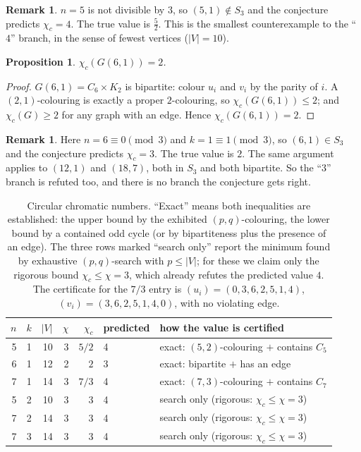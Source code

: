 \documentclass[11pt]{article}
\newtheorem{proposition}[theorem]{Proposition}
\theoremstyle{definition}
\newtheorem{remark}[theorem]{Remark}
\newcommand{\chic}{\chi_c}
\begin{document}
\begin{remark}
$n = 5$ is not divisible by $3$, so $(5,1) \notin S_3$ and the conjecture
predicts $\chic = 4$. The true value is $\tfrac52$. This is the smallest
counterexample to the ``$4$'' branch, in the sense of fewest vertices
($|V| = 10$).
\end{remark}

\begin{proposition}\label{prop:hex}
$\chic(G(6,1)) = 2$.
\end{proposition}

\begin{proof}
$G(6,1) = C_6 \times K_2$ is bipartite: colour $u_i$ and $v_i$ by the parity
of $i$. A $(2,1)$-colouring is exactly a proper $2$-colouring, so
$\chic(G(6,1)) \le 2$; and $\chic(G) \ge 2$ for any graph with an edge. Hence
$\chic(G(6,1)) = 2$.
\end{proof}

\begin{remark}
Here $n = 6 \equiv 0 \pmod 3$ and $k = 1 \equiv 1 \pmod 3$, so $(6,1) \in
S_3$ and the conjecture predicts $\chic = 3$. The true value is $2$. The same
argument applies to $(12,1)$ and $(18,7)$, both in $S_3$ and both bipartite.
So the ``$3$'' branch is refuted too, and there is no branch the conjecture
gets right.
\end{remark}

\begin{table}[h]
\centering
\begin{tabular}{rrrrrll}
\toprule
$n$ & $k$ & $|V|$ & $\chi$ & $\chic$ & predicted & how the value is certified\\
\midrule
5 & 1 & 10 & 3 & $5/2$ & 4 & exact: $(5,2)$-colouring $+$ contains $C_5$\\
6 & 1 & 12 & 2 & $2$   & 3 & exact: bipartite $+$ has an edge\\
7 & 1 & 14 & 3 & $7/3$ & 4 & exact: $(7,3)$-colouring $+$ contains $C_7$\\
5 & 2 & 10 & 3 & $3$   & 4 & search only (rigorous: $\chic \le \chi = 3$)\\
7 & 2 & 14 & 3 & $3$   & 4 & search only (rigorous: $\chic \le \chi = 3$)\\
7 & 3 & 14 & 3 & $3$   & 4 & search only (rigorous: $\chic \le \chi = 3$)\\
\bottomrule
\end{tabular}
\caption{Circular chromatic numbers. ``Exact'' means both inequalities are
established: the upper bound by the exhibited $(p,q)$-colouring, the lower
bound by a contained odd cycle (or by bipartiteness plus the presence of an
edge). The three rows marked ``search only'' report the minimum found by
exhaustive $(p,q)$-search with $p \le |V|$; for these we claim only the
rigorous bound $\chic \le \chi = 3$, which already refutes the predicted
value $4$. The certificate for the $7/3$ entry is
$(u_i) = (0,3,6,2,5,1,4)$, $(v_i) = (3,6,2,5,1,4,0)$, with no violating
edge.}
\end{table}
\end{document}
